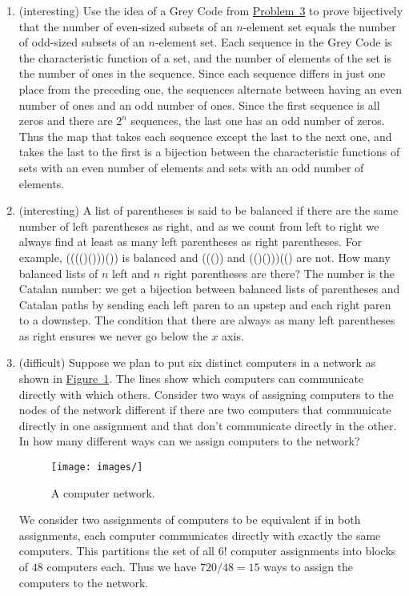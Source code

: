 \documentclass[10pt,]{book}
\theoremstyle{plain}
\theoremstyle{definition}
\numberwithin{equation}{chapter}
\begin{document}
\begin{enumerate}
%
\item\hypertarget{li-12}{}(interesting) Use the idea of a Grey Code from \hyperlink{GreyCode}{Problem~3} to prove bijectively that the number of even-sized subsets of an \(n\)-element set equals the number of odd-sized subsets of an \(n\)-element set. Each sequence in the Grey Code is the characteristic function of a set, and the number of elements of the set is the number of ones in the sequence. Since each sequence differs in just one place from the preceding one, the sequences alternate between having an even number of ones and an odd number of ones. Since the first sequence is all zeros and there are \(2^n\) sequences, the last one has an odd number of zeros. Thus the map that takes each sequence except the last to the next one, and takes the last to the first is a bijection between the characteristic functions of sets with an even number of elements and sets with an odd number of elements.%
%
\item\hypertarget{li-13}{}(interesting) A list of parentheses is said to be balanced if there are the same number of left parentheses as right, and as we count from left to right we always find at least as many left parentheses as right parentheses.  For example, (((()()))()) is balanced and ((()) and (()()))(() are not.  How many balanced lists of \(n\) left and \(n\)  right parentheses are there? The number is the Catalan number: we get a bijection between balanced lists of parentheses and Catalan paths by sending each left paren to an upstep and each right paren to a downstep. The condition that there are always as many left parentheses as right ensures we never go below the \(x\) axis.%
%
\item\hypertarget{li-14}{}(difficult) Suppose we plan to put six distinct computers in a network as shown in \hyperref[hexagonalnetwork]{Figure~\ref{hexagonalnetwork}}.  The lines show which computers can communicate directly with which others.  Consider two ways of assigning computers to the nodes of the network different if there are two computers that communicate directly in one assignment and that don't communicate directly in the other.  In how many different ways can we assign computers to the network? \begin{figure}
\centering
\texttt{[image: images/]}
\caption{A computer network.\label{hexagonalnetwork}}
\end{figure}
 We consider two assignments of computers to be equivalent if in both assignments, each computer communicates directly with exactly the same computers. This partitions the set of all \(6!\) computer assignments into blocks of \(48\) computers each. Thus we have \(720/48=15\) ways to assign the computers to the network.%

\end{enumerate}
\end{document}
